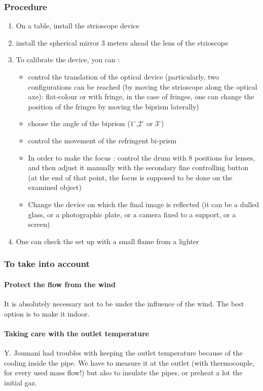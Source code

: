 \subsubsection{Procedure}

\begin{enumerate}
\item On a table, install the strioscope device
\item install the spherical mirror 3 meters ahead the lens of the strioscope
\item To calibrate the device, you can : \begin{itemize}
\item control the translation of the optical device (particularly, two configurations can be reached (by moving the strioscope along the optical axe): flat-colour or with fringe, in the case of fringes, one can change the position of the fringes by moving the biprism laterally)
\item choose the angle of the biprism ($1^\circ$,$2^\circ $ or $3^\circ$)
\item control the movement of the refringent bi-prism
\item In order to make the focus : control the drum with 8 positions for lenses, and then adjust it manually with the secondary fine controlling button (at the end of that point, the focus is supposed to be done on the examined object)
\item Change the device on which the final image is reflected (it can be a dulled glass, or a photographic plate, or a camera fixed to a support, or a screen)
\end{itemize}
\item One can check the set up with a small flame from a lighter
\end{enumerate}
\subsubsection{To take into account}
\paragraph{Protect the flow from the wind} It is absolutely necessary not to be under the influence of the wind. The best option is to make it indoor.

\paragraph{Taking care with the outlet temperature} Y. Joumani had troubles with keeping the outlet temperature because of the cooling inside the pipe. We have to measure it at the outlet (with thermocouple, for every used mass flow!) but also to insulate the pipes, or preheat a lot the initial gaz.

